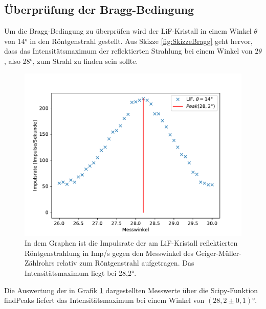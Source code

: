 \documentclass[titlepage = firstcover]{scrartcl}
\begin{document}
        \subsection{Überprüfung der Bragg-Bedingung}
            Um die Bragg-Bedingung zu überprüfen wird der LiF-Kristall in einem Winkel $\theta$ von 14° in den Röntgenstrahl gestellt. Aus Skizze \ref{fig:SkizzeBragg} geht hervor, dass das 
            Intensitätsmaximum der reflektierten Strahlung bei einem Winkel von $2\theta$, also 28°, zum Strahl zu finden sein sollte.
            \FloatBarrier
            \begin{figure}[h]
              \centering
              \includegraphics{Bragg.pdf}
              \caption{In dem Graphen ist die Impulsrate der am LiF-Kristall reflektierten Röntgenstrahlung in Imp/s gegen den Messwinkel des Geiger-Müller-Zählrohrs relativ zum Röntgenstrahl aufgetragen. Das Intensitätsmaximum liegt bei 28,2°.}
              \label{fig:bragggraph}
            \end{figure}
            \FloatBarrier  

            \noindent
            Die Auswertung der in Grafik \ref{fig:bragggraph} dargestellten Messwerte über die Scipy-Funktion findPeaks liefert das Intensitätsmaximum bei einem Winkel von $(28,2 \pm 0,1)°$. 

        \newpage
\end{document}
